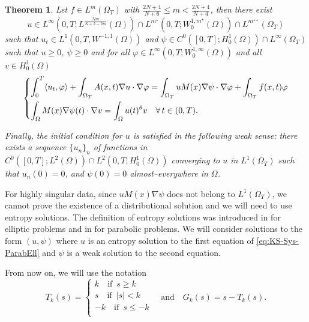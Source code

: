 \documentclass{amsart}
\numberwithin{equation}{section}
\newtheorem{theo}[example]{Theorem}
\def\elle#1{L^{#1}}
\def\elleom#1{L^{#1}(\Omega)}
\def\elleomT#1{L^{#1}(\Omega_T)}
\def\Sobom#1{W^{1,#1}_0(\Omega)}
\def\Hom{H^1_0(\Omega)}
\def\io{\int_\Omega}
\def\ioT{\int_{\Omega_T}}
\newcommand{\abs}[1]{\left|#1\right|}
\begin{document}
\begin{theo}\label{Main_Theorem_3}
     Let $f\in\elleomT m$ with $\frac{2N+4}{N+6}\leq m<\frac{2N+4}{N+4}$, then there exist 
     $$u\in\elle\infty(0,T;\elleom{\frac{Nm}{N+2-2m}})\cap\elle {m^\star}(0,T;\Sobom{m^\star})\cap \elleomT {m^{\star\star}}$$ such that $u_t\in\elle1(0,T,W^{-1,1}(\Omega))$ and $\psi\in C^0([0,T];\Hom)\cap\elle\infty(\Omega_T)$ such that $u\geq0$, $\psi\geq0$ and for all $\varphi\in\elle\infty(0,T;\Sobom \infty)$ and all $v\in\Hom$
    \begin{equation}\label{DefSol_parabell_theo3}
        \begin{dcases}
                \int_0^T \langle u_t,\varphi\rangle+\ioT A(x,t)\nabla u\cdot \nabla \varphi = \ioT uM(x)\nabla \psi\cdot\nabla\varphi + \ioT f(x,t)\varphi\\
                \io M(x)\nabla \psi(t)\cdot\nabla v = \io u(t)^\theta v\quad\forall\,t\in(0,T).
        \end{dcases}
    \end{equation}

    Finally, the initial condition for $u$ is satisfied in the following weak sense: there exists a sequence $\{u_n\}_n$ of functions in $C^0([0, T] ; L^2(\Omega)) \cap L^2(0, T ;\Hom)$ converging to $u$ in $\elleomT1$ such that $u_n(0)=0$, and $\psi(0)=0$ almost--everywhere in $\Omega$.
\end{theo}

For highly singular data, since $uM(x)\nabla\psi$ does not belong to $\elleomT1$, we cannot prove the existence of a distributional solution and we will need to use entropy solutions. The definition of entropy solutions was introduced in \cite{LavoroB6} for elliptic problems and in \cite{Prignet-entropy} for parabolic problems. We will consider solutions to the form $(u,\psi)$ where $u$ is an entropy solution to the first equation of \eqref{eq:KS-Sys-ParabEll} and $\psi$ is a weak solution to the second equation.

\noindent From now on, we will use the notation 
\[
T_k(s)=
\begin{cases}
    k\quad\text{if }\,s\geq k\\
    s\quad\text{if }\,\abs{s}< k\\
    -k\quad\text{if }\,s\leq- k\\
    \end{cases}\quad\text{and}\quad
    G_k(s)=s-T_k(s).
\]
\end{document}
